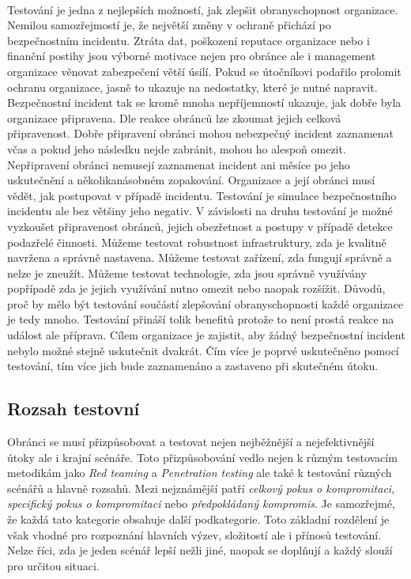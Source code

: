 \paragraph{}
Testování je jedna z nejlepších možností, jak zlepšit obranyschopnost organizace.
Nemilou samozřejmostí je, že největší změny v ochraně přichází po bezpečnostním incidentu.
Ztráta dat, poškození reputace organizace nebo i finanční postihy jsou výborné motivace nejen pro obránce ale i management organizace věnovat zabezpečení větší úsilí.
Pokud se útočníkovi podařilo prolomit ochranu organizace, jasně to ukazuje na nedostatky, které je nutné napravit.
Bezpečnostní incident tak se kromě mnoha nepříjemností ukazuje, jak dobře byla organizace připravena.
Dle reakce obránců lze zkoumat jejich celková připravenost.
Dobře připravení obránci mohou nebezpečný incident zaznamenat včas a pokud jeho následku nejde zabránit, mohou ho alespoň omezit.
Nepřipravení obránci nemusejí zaznamenat incident ani měsíce po jeho uskutečnění a několikanásobném zopakování.
Organizace a její obránci musí vědět, jak postupovat v případě incidentu.
Testování je simulace bezpečnostního incidentu ale bez většiny jeho negativ.
V závislosti na druhu testování je možné vyzkoušet připravenost obránců, jejich obezřetnost a postupy v případě detekce podazřelé činnosti.
Můžeme testovat robustnost infrastruktury, zda je kvalitně navržena a správně nastavena.
Můžeme testovat zařízení, zda fungují správně a nelze je zneužít.
Můžeme testovat technologie, zda jsou správně využívány popřípadě zda je jejich využívání nutno omezit nebo naopak rozšížit.
Důvodů, proč by mělo být testování součástí zlepšování obranyschopnosti každé organizace je tedy mnoho.
Testování přináší tolik benefitů protože to není prostá reakce na událost ale příprava.
Cílem organizace je zajistit, aby žádný bezpečnostní incident nebylo možné stejně uskutečnit dvakrát.
Čím více je poprvé uskutečněno pomocí testování, tím více jich bude zaznamenáno a zastaveno při skutečném útoku.


\subsection{Rozsah testovní}
Obránci se musí přizpůsobovat a testovat nejen nejběžnější a nejefektivnější útoky ale i krajní scénáře.
Toto přizpůsobování vedlo nejen k různým testovacím metodikám jako \textit{Red teaming} a \textit{Penetration testing} ale také k testování různých scénářů a hlavně rozsahů.
Mezi nejznámější patří \textit{celkový pokus o kompromitaci}, \textit{specifický pokus o kompromitaci} nebo \textit{předpokládaný kompromis}.
Je samozřejmé, že každá tato kategorie obsahuje další podkategorie.
Toto základní rozdělení je však vhodné pro rozpoznání hlavních výzev, složitostí ale i přínosů testování.
Nelze říci, zda je jeden scénář lepší nežli jiné, naopak se doplňují a každý slouží pro určitou situaci.\cite{red_team_oakley_2019}

